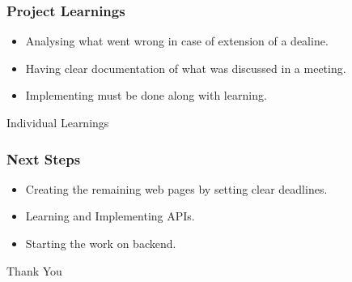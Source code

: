 \documentclass{beamer}
\begin{document}
\begin{frame}
\frametitle{Project Learnings}
\begin{itemize}
  \item Analysing what went wrong in case of extension of a dealine.
  \item Having clear documentation of what was discussed in a meeting.
  \item Implementing must be done along with learning.
\end{itemize}
\end{frame}

\begin{frame}
  \center\Huge Individual Learnings
\end{frame}

\begin{frame}
\frametitle{Next Steps}
\begin{itemize}
  \item Creating the remaining web pages by setting clear deadlines.
  \item Learning and Implementing APIs.
  \item Starting the work on backend.
\end{itemize}
\end{frame}

\begin{frame}
  \center\Huge Thank You
\end{frame}
\end{document}
